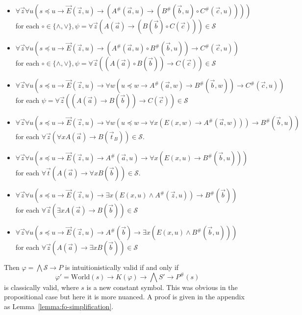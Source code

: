 \documentclass[runningheads]{llncs}
\begin{document}
\begin{itemize}
	\item $\forall \vec z\forall u(s\preceq u\to \vec E(\vec z, u)\to (A^\#(\vec a, u)\to (B^\#(\vec b, u)\circ C^\#(\vec c, u))))$\\for each $\circ\in\{\wedge, \vee\}, \psi = \forall \vec z(A(\vec a)\to (B(\vec b)\circ C(\vec c)))\in\mathcal S$
	\item $\forall \vec z\forall u(s\preceq u\to\vec E(\vec z, u)\to (A^\#(\vec a, u)\circ B^\#(\vec b, u))\to C^\#(\vec c, u))$\\for each $\circ\in\{\wedge, \vee\}, \psi = \forall \vec z((A(\vec a)\circ B(\vec b))\to C(\vec c))\in\mathcal S$
	\item $\forall \vec z\forall u(s\preceq u\to\vec E(\vec z, u)\to\forall w(u\preceq w\to A^\#(\vec a, w)\to B^\#(\vec b, w))\to C^\#(\vec c, u))$\\ for each $\psi = \forall \vec z((A(\vec a)\to B(\vec b))\to C(\vec c))\in\mathcal S$
	\item  $\forall \vec z\forall u(s\preceq u\to\vec E(\vec z, u)\to \forall w(u\preceq w\to \forall x(E(x, w)\to A^\#(\vec a, w)))\to B^\#(\vec b, u))$\\for each $\forall \vec z(\forall xA(\vec a)\to B(\vec t_B))\in\mathcal S$.
	\item $\forall \vec z\forall u(s\preceq u\to\vec E(\vec z, u)\to A^\#(\vec a, u)\to \forall x(E(x, u)\to B^\#(\vec b, u)))$\\for each $\forall \vec t(A(\vec a)\to \forall xB(\vec b))\in\mathcal S$.
	\item $\forall \vec z\forall u(s\preceq u\to\vec E(\vec z, u)\to \exists x(E(x, u)\wedge A^\#(\vec z, u))\to B^\#(\vec b))$\\for each $\forall \vec z(\exists xA(\vec a)\to B(\vec b))\in\mathcal S$
	\item $\forall \vec z\forall u(s\preceq u\to\vec E(\vec z, u)\to A^\#(\vec b)\to \exists x(E(x, u)\wedge B^\#(\vec b, u)))$\\for each $\forall \vec z(A(\vec a)\to \exists xB(\vec b))\in\mathcal S$
\end{itemize}

Then $\varphi = \bigwedge\mathcal S\to P$ is intuitionistically valid if and only if
$$\varphi' = \text{World}(s)\to K(\varphi)\to \bigwedge S'\to P^\#(s)$$
is classically valid, where $s$ is a new constant symbol. This was obvious in the propositional case but here it is more nuanced. A proof is given in the appendix as Lemma~\ref{lemma:fo-simplification}.
\end{document}
